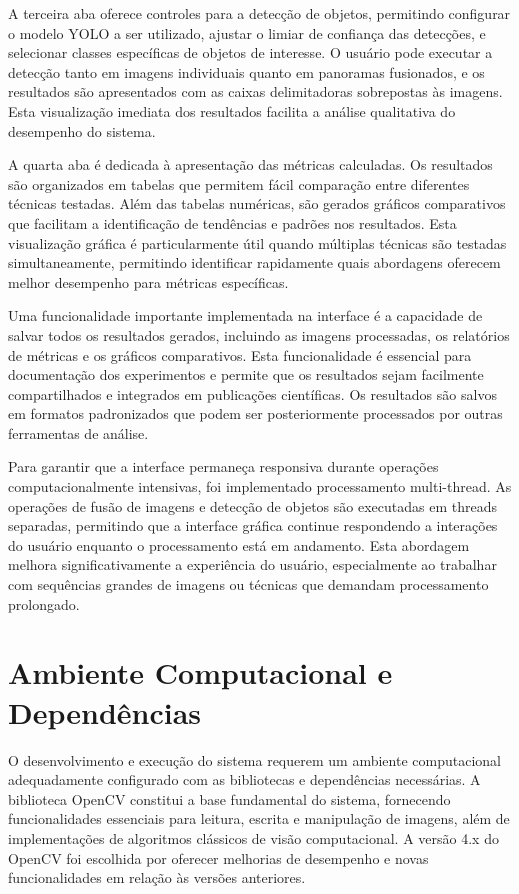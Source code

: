A terceira aba oferece controles para a detecção de objetos, permitindo configurar o modelo YOLO a ser utilizado, ajustar o limiar de confiança das detecções, e selecionar classes específicas de objetos de interesse. O usuário pode executar a detecção tanto em imagens individuais quanto em panoramas fusionados, e os resultados são apresentados com as caixas delimitadoras sobrepostas às imagens. Esta visualização imediata dos resultados facilita a análise qualitativa do desempenho do sistema.

A quarta aba é dedicada à apresentação das métricas calculadas. Os resultados são organizados em tabelas que permitem fácil comparação entre diferentes técnicas testadas. Além das tabelas numéricas, são gerados gráficos comparativos que facilitam a identificação de tendências e padrões nos resultados. Esta visualização gráfica é particularmente útil quando múltiplas técnicas são testadas simultaneamente, permitindo identificar rapidamente quais abordagens oferecem melhor desempenho para métricas específicas.

Uma funcionalidade importante implementada na interface é a capacidade de salvar todos os resultados gerados, incluindo as imagens processadas, os relatórios de métricas e os gráficos comparativos. Esta funcionalidade é essencial para documentação dos experimentos e permite que os resultados sejam facilmente compartilhados e integrados em publicações científicas. Os resultados são salvos em formatos padronizados que podem ser posteriormente processados por outras ferramentas de análise.

Para garantir que a interface permaneça responsiva durante operações computacionalmente intensivas, foi implementado processamento multi-thread. As operações de fusão de imagens e detecção de objetos são executadas em threads separadas, permitindo que a interface gráfica continue respondendo a interações do usuário enquanto o processamento está em andamento. Esta abordagem melhora significativamente a experiência do usuário, especialmente ao trabalhar com sequências grandes de imagens ou técnicas que demandam processamento prolongado.

\section{Ambiente Computacional e Dependências}

O desenvolvimento e execução do sistema requerem um ambiente computacional adequadamente configurado com as bibliotecas e dependências necessárias. A biblioteca OpenCV constitui a base fundamental do sistema, fornecendo funcionalidades essenciais para leitura, escrita e manipulação de imagens, além de implementações de algoritmos clássicos de visão computacional. A versão 4.x do OpenCV foi escolhida por oferecer melhorias de desempenho e novas funcionalidades em relação às versões anteriores.

